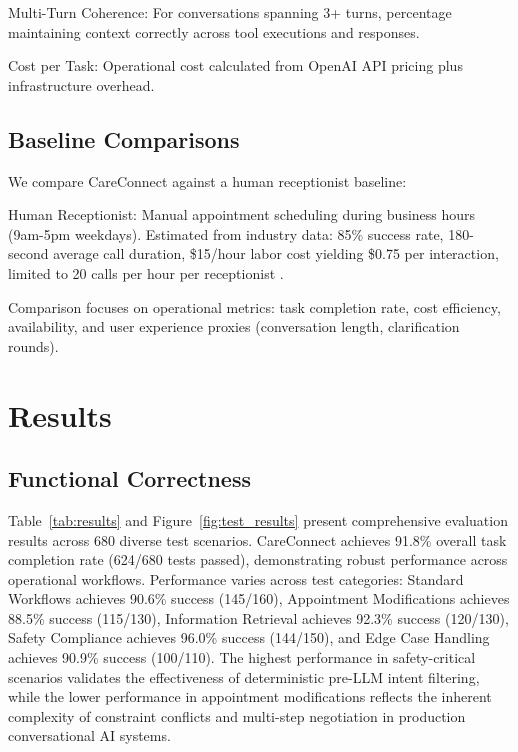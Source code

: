\documentclass[conference]{IEEEtran}
\begin{document}
Multi-Turn Coherence: For conversations spanning 3+ turns, percentage maintaining context correctly across tool executions and responses.

Cost per Task: Operational cost calculated from OpenAI API pricing plus infrastructure overhead.

\subsection{Baseline Comparisons}

We compare CareConnect against a human receptionist baseline:

Human Receptionist: Manual appointment scheduling during business hours (9am-5pm weekdays). Estimated from industry data: 85\% success rate, 180-second average call duration, \$15/hour labor cost yielding \$0.75 per interaction, limited to 20 calls per hour per receptionist \cite{focuscare, receptionistwages}.

Comparison focuses on operational metrics: task completion rate, cost efficiency, availability, and user experience proxies (conversation length, clarification rounds).

\section{Results}

\subsection{Functional Correctness}

Table~\ref{tab:results} and Figure~\ref{fig:test_results} present comprehensive evaluation results across 680 diverse test scenarios. CareConnect achieves 91.8\% overall task completion rate (624/680 tests passed), demonstrating robust performance across operational workflows. Performance varies across test categories: Standard Workflows achieves 90.6\% success (145/160), Appointment Modifications achieves 88.5\% success (115/130), Information Retrieval achieves 92.3\% success (120/130), Safety Compliance achieves 96.0\% success (144/150), and Edge Case Handling achieves 90.9\% success (100/110). The highest performance in safety-critical scenarios validates the effectiveness of deterministic pre-LLM intent filtering, while the lower performance in appointment modifications reflects the inherent complexity of constraint conflicts and multi-step negotiation in production conversational AI systems.
\end{document}

